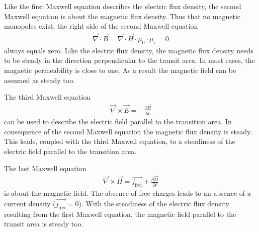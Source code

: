 \documentclass[ twoside,openright,titlepage,%
                paper=a4,fontsize=11pt,%
                ngerman
                ]{scrartcl}
\numberwithin{equation}{section}
\begin{document}
Like the first Maxwell equation describes the electric flux density, the second Maxwell equation is about the magnetic flux density. Thus that no magnetic monopoles exist, the right side of the second Maxwell equation
\begin{align}
\vec{\nabla} \cdot \vec{B} = \vec{\nabla} \cdot \vec{H}\cdot \mu_0 \cdot \mu_\text{r} =  0 \label{eq:Maxwell2}
\end{align}
always equals zero. Like the electric flux density, the magnetic flux density needs to be steady in the direction perpendicular to the transit area. In most cases, the magnetic permeability is close to one. As a result the magnetic field can be assumed as steady too.

The third Maxwell equation 
\begin{align}
\vec{\nabla} \times \vec{E} = -\frac{\partial \vec{B}}{\partial t} \label{eq:Maxwell3}
\end{align}
can be used to describe the electric field parallel to the transition area. In consequence of the second Maxwell equation the magnetic flux density is steady. This leads, coupled with the third Maxwell equation, to a steadiness of the electric field parallel to the transition area.

The last Maxwell equation 
\begin{align}
\vec{\nabla} \times \vec{H} = \vec{j_\text{frei}} + \frac{\partial \vec{D}}{\partial t} \label{eq:Maxwell4}
\end{align}
is about the magnetic field. The absence of free charges leads to an absence of a current density ($\overrightarrow{j_\text{frei}} = 0$). With the steadiness of the electric flux density resulting from the first Maxwell equation, the magnetic field parallel to the transit area is steady too.
\end{document}
